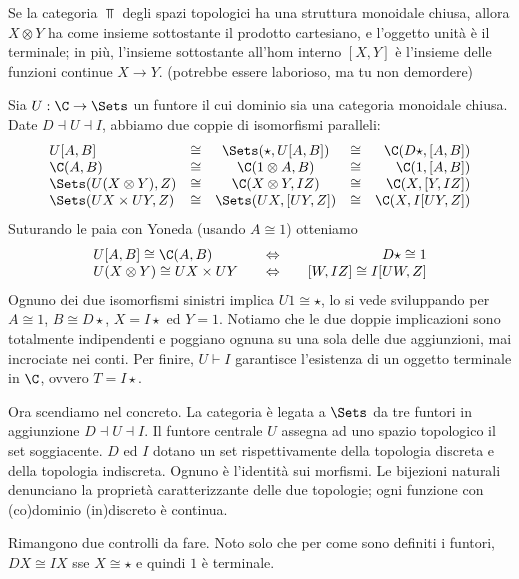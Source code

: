 \begin{MyExercise}
Se la categoria $\Top$ degli spazi topologici ha una struttura monoidale chiusa, allora $X\otimes Y$ ha come insieme sottostante il prodotto cartesiano, e l'oggetto unit\`a \`e il terminale; in pi\`u, l'insieme sottostante all'hom interno $[X,Y]$ \`e l'insieme delle funzioni continue $X\to Y$. (potrebbe essere laborioso, ma tu non demordere)
\end{MyExercise}
Sia $U:\C\rightarrow\Sets$ un funtore il cui dominio sia una categoria monoidale chiusa.
Date $D\dashv U\dashv I$, abbiamo due coppie di isomorfismi paralleli:
\[\begin{array}{lcccr}
U[A,B]
&\cong&
\Sets( \star, U[A,B] )
&\cong&
\C( D\star, [A,B] ) \\
\C( A, B )
&\cong&
\C( 1 \otimes A, B )
&\cong&
\C( 1, [A,B] ) \\
\Sets( U ( X \otimes Y ), Z )
&\cong&
\C( X \otimes Y, IZ )
&\cong&
\C( X, [Y,IZ] ) \\
\Sets( UX \times UY, Z )
&\cong&
\Sets( UX, [UY,Z] )
&\cong&
\C( X, I[UY,Z] )
\end{array}\]
Suturando le paia con Yoneda (usando $A\cong1$) otteniamo
\[\begin{array}{lcr}
U[A,B] \cong \C(A,B)
&\quad\Leftrightarrow\quad&
D\star \cong 1 \\
U ( X \otimes Y ) \cong UX \times UY
&\quad\Leftrightarrow\quad&
[W,IZ] \cong I[UW,Z]
\end{array}\]
Ognuno dei due isomorfismi sinistri implica $U1\cong\star$, lo si vede sviluppando per $A\cong1$, $B\cong D\star$, $X=I\star$ ed $Y=1$. Notiamo che le due doppie implicazioni sono totalmente indipendenti e poggiano ognuna su una sola delle due aggiunzioni, mai incrociate nei conti. Per finire, $U\vdash I$ garantisce l'esistenza di un oggetto terminale in $\C$, ovvero $T=I\star$.

Ora scendiamo nel concreto.
La categoria {\Top} è legata a $\Sets$ da tre funtori in aggiunzione $D\dashv U\dashv I$.
Il funtore centrale $U$ assegna ad uno spazio topologico il set soggiacente.
$D$ ed $I$ dotano un set rispettivamente della topologia discreta e della topologia indiscreta.
Ognuno è l'identità sui morfismi.
Le bijezioni naturali denunciano la proprietà caratterizzante delle due topologie; ogni funzione con (co)dominio (in)discreto è continua.

Rimangono due controlli da fare. Noto solo che per come sono definiti i funtori, $DX\cong IX$ sse $X\cong\star$ e quindi $1$ è terminale.

